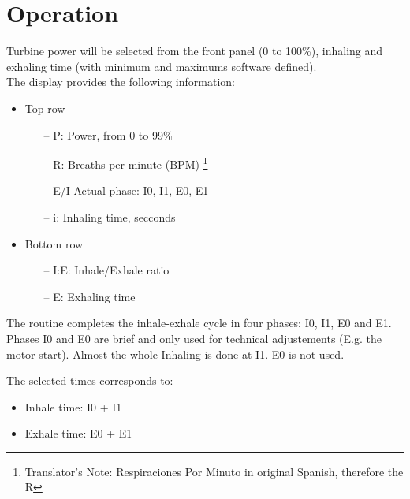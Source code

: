 \section{Operation}
    Turbine power will be selected from the front panel (0 to 100\%), inhaling and exhaling time (with minimum and maximums software defined).\\
    
    The display provides the following information:
    \begin{itemize}
        \item Top row
        \begin{itemize}
            \item[--] P: Power, from 0 to 99\%
            \item[--] R: Breaths per minute (BPM) \footnote{Translator's Note: Respiraciones Por Minuto in original Spanish, therefore the R}
            \item[--] E/I Actual phase: I0, I1, E0, E1
            \item[--] i: Inhaling time, secconds
        \end{itemize}
        \item Bottom row
        \begin{itemize}
            \item[--] I:E: Inhale/Exhale ratio
            \item[--] E: Exhaling time
        \end{itemize}
    \end{itemize}
    
    The routine completes the inhale-exhale cycle in four phases: I0, I1, E0 and E1. Phases I0 and E0 are brief and only used for technical adjustements (E.g. the motor start). Almost the whole Inhaling is done at I1. E0 is not used.
    
    The selected times corresponds to:
    \begin{itemize}
        \item Inhale time: I0 + I1
        \item Exhale time: E0 + E1
    \end{itemize}
    
